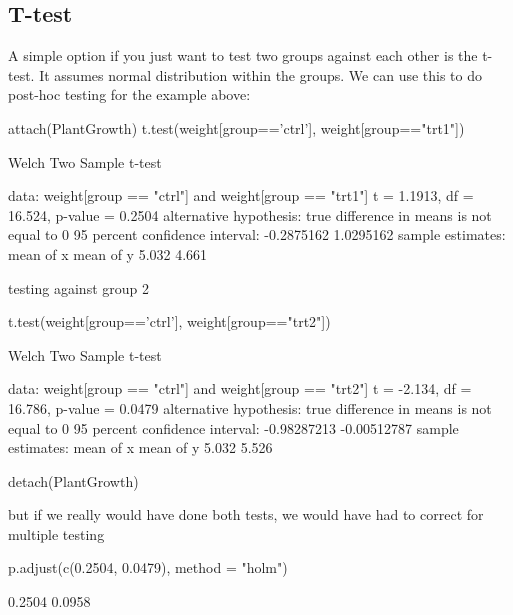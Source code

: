 \documentclass[a4paper,twoside]{tufte-book}\usepackage[]{graphicx}\usepackage[]{color}
\begin{document}
\begin{Anhang}
\subsection{T-test}

A simple option if you just want to test two groups against each other is the t-test. It assumes normal distribution within the groups. We can use this to do post-hoc testing for the example above: 

\begin{Schunk}
\begin{Sinput}
attach(PlantGrowth)
t.test(weight[group=='ctrl'], weight[group=="trt1"])
\end{Sinput}
\begin{Soutput}

	Welch Two Sample t-test

data:  weight[group == "ctrl"] and weight[group == "trt1"]
t = 1.1913, df = 16.524, p-value = 0.2504
alternative hypothesis: true difference in means is not equal to 0
95 percent confidence interval:
 -0.2875162  1.0295162
sample estimates:
mean of x mean of y 
    5.032     4.661 
\end{Soutput}
\end{Schunk}

testing against group 2

\begin{Schunk}
\begin{Sinput}
t.test(weight[group=='ctrl'], weight[group=="trt2"])
\end{Sinput}
\begin{Soutput}

	Welch Two Sample t-test

data:  weight[group == "ctrl"] and weight[group == "trt2"]
t = -2.134, df = 16.786, p-value = 0.0479
alternative hypothesis: true difference in means is not equal to 0
95 percent confidence interval:
 -0.98287213 -0.00512787
sample estimates:
mean of x mean of y 
    5.032     5.526 
\end{Soutput}
\begin{Sinput}
detach(PlantGrowth)
\end{Sinput}
\end{Schunk}

but if we really would have done both tests, we would have had to correct for multiple testing

\begin{Schunk}
\begin{Sinput}
p.adjust(c(0.2504, 0.0479), method = "holm")
\end{Sinput}
\begin{Soutput}
[1] 0.2504 0.0958
\end{Soutput}
\end{Schunk}


\end{Anhang}
\end{document}
